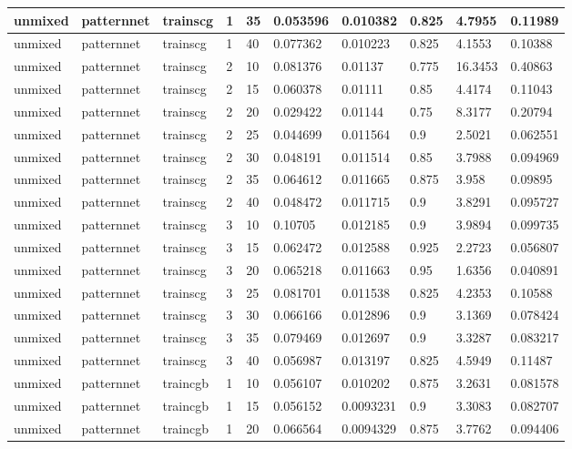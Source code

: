 \begin{longtable}{lllllllll}
unmixed & patternnet & trainscg & 1 & 35 & 0.053596 & 0.010382 & 0.825 & 4.7955 & 0.11989 \\ \hline 
unmixed & patternnet & trainscg & 1 & 40 & 0.077362 & 0.010223 & 0.825 & 4.1553 & 0.10388 \\ \hline 
unmixed & patternnet & trainscg & 2 & 10 & 0.081376 & 0.01137 & 0.775 & 16.3453 & 0.40863 \\ \hline 
unmixed & patternnet & trainscg & 2 & 15 & 0.060378 & 0.01111 & 0.85 & 4.4174 & 0.11043 \\ \hline 
unmixed & patternnet & trainscg & 2 & 20 & 0.029422 & 0.01144 & 0.75 & 8.3177 & 0.20794 \\ \hline 
unmixed & patternnet & trainscg & 2 & 25 & 0.044699 & 0.011564 & 0.9 & 2.5021 & 0.062551 \\ \hline 
unmixed & patternnet & trainscg & 2 & 30 & 0.048191 & 0.011514 & 0.85 & 3.7988 & 0.094969 \\ \hline 
unmixed & patternnet & trainscg & 2 & 35 & 0.064612 & 0.011665 & 0.875 & 3.958 & 0.09895 \\ \hline 
unmixed & patternnet & trainscg & 2 & 40 & 0.048472 & 0.011715 & 0.9 & 3.8291 & 0.095727 \\ \hline 
unmixed & patternnet & trainscg & 3 & 10 & 0.10705 & 0.012185 & 0.9 & 3.9894 & 0.099735 \\ \hline 
unmixed & patternnet & trainscg & 3 & 15 & 0.062472 & 0.012588 & 0.925 & 2.2723 & 0.056807 \\ \hline 
unmixed & patternnet & trainscg & 3 & 20 & 0.065218 & 0.011663 & 0.95 & 1.6356 & 0.040891 \\ \hline 
unmixed & patternnet & trainscg & 3 & 25 & 0.081701 & 0.011538 & 0.825 & 4.2353 & 0.10588 \\ \hline 
unmixed & patternnet & trainscg & 3 & 30 & 0.066166 & 0.012896 & 0.9 & 3.1369 & 0.078424 \\ \hline 
unmixed & patternnet & trainscg & 3 & 35 & 0.079469 & 0.012697 & 0.9 & 3.3287 & 0.083217 \\ \hline 
unmixed & patternnet & trainscg & 3 & 40 & 0.056987 & 0.013197 & 0.825 & 4.5949 & 0.11487 \\ \hline 
unmixed & patternnet & traincgb & 1 & 10 & 0.056107 & 0.010202 & 0.875 & 3.2631 & 0.081578 \\ \hline 
unmixed & patternnet & traincgb & 1 & 15 & 0.056152 & 0.0093231 & 0.9 & 3.3083 & 0.082707 \\ \hline 
unmixed & patternnet & traincgb & 1 & 20 & 0.066564 & 0.0094329 & 0.875 & 3.7762 & 0.094406 \\ \hline 

\end{longtable}
